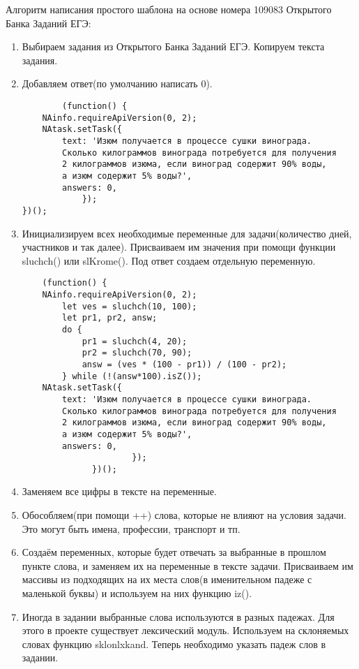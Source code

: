 Алгоритм написания простого шаблона на основе номера 109083 Открытого Банка Заданий ЕГЭ:%
\begin{enumerate}
    \item Выбираем задания из Открытого Банка Заданий ЕГЭ. Копируем текста задания.
    \item Добавляем ответ(по умолчанию написать 0).
          \begin{verbatim}
        (function() {
	NAinfo.requireApiVersion(0, 2);
    NAtask.setTask({
        text: 'Изюм получается в процессе сушки винограда. 
        Сколько килограммов винограда потребуется для получения 
        2 килограммов изюма, если виноград содержит 90% воды,
        а изюм содержит 5% воды?',
        answers: 0,
            });
})();
        \end{verbatim}
    \item Инициализируем всех необходимые переменные для задачи(количество дней, участников и так далее). Присваиваем им значения при помощи функции sluchch() или
     slKrome(). Под ответ создаем отдельную переменную.
          \begin{verbatim}     
    (function() {
    NAinfo.requireApiVersion(0, 2);
        let ves = sluchch(10, 100);
        let pr1, pr2, answ;
        do {
            pr1 = sluchch(4, 20);
            pr2 = sluchch(70, 90);
            answ = (ves * (100 - pr1)) / (100 - pr2);
        } while (!(answ*100).isZ());
    NAtask.setTask({
        text: 'Изюм получается в процессе сушки винограда.
        Сколько килограммов винограда потребуется для получения
        2 килограммов изюма, если виноград содержит 90% воды,
        а изюм содержит 5% воды?',
        answers: 0,
                      });
              })();
            \end{verbatim}
    \item Заменяем все цифры в тексте на переменные.
    \item Обособляем(при помощи ++) слова, которые не влияют на условия задачи. Это могут быть имена, профессии, транспорт и тп.
    \item Создаём переменных, которые будет отвечать за выбранные в прошлом пункте слова, и заменяем их на переменные в тексте задачи.
          Присваиваем им массивы из подходящих на их места слов(в именительном падеже с маленькой буквы) и используем на них функцию iz().
    \item Иногда в задании выбранные слова используются в разных падежах. Для этого в проекте существует лексический модуль. Используем на склоняемых словах функцию sklonlxkand. Теперь необходимо указать падеж слов в задании.

\end{enumerate}
